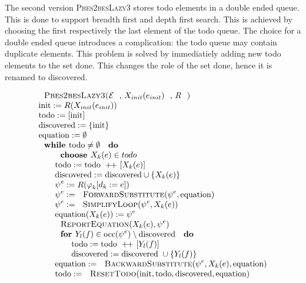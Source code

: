 The second version \textsc{Pbes2besLazy3} stores todo elements in a double ended queue. This is done to support
breadth first and depth first search. This is achieved by choosing the first respectively the last element of the todo
queue. The choice for a double ended queue introduces a complication: the todo queue may contain duplicate
elements. This problem is solved by immediatiely adding new todo elements to the set done. This changes the
role of the set done, hence it is renamed to discovered.

\begin{equation*}
\begin{array}{l}
\text{\textsc{Pbes2besLazy3(}}\mathcal{E}\text{, }X_{init}(e_{init})\text{, }%
R\text{\textsc{)}} \\
\mathrm{init}:=R(X_{init}(e_{init})) \\
\mathrm{todo}:=[\mathrm{init}] \\
\mathrm{discovered}:=\{ \mathrm{init} \} \\
\mathrm{equation}:=\emptyset  \\
\text{\textbf{while }}\mathrm{todo}\neq \emptyset \text{ \textbf{do}} \\
\qquad \text{\textbf{choose }}X_{k}(e)\in todo \\
\qquad \mathrm{todo}:=\mathrm{todo}\ +\!\!+ \ [X_{k}(e)] \\
\qquad \mathrm{discovered}:=\mathrm{discovered}\cup \{X_{k}(e)\} \\
\qquad \psi ^{e}:=R(\varphi _{k}[d_{k}:=e]) \\
\qquad \psi ^{e}:=\text{\textsc{ForwardSubstitute}}(\psi ^{e},\mathrm{%
equation}) \\
\qquad \psi ^{e}:=\text{\textsc{SimplifyLoop}}(\psi ^{e},X_{k}(e)) \\
\qquad \mathrm{equation}(X_{k}(e)):=\psi ^{e} \\
\qquad \text{\textsc{ReportEquation}}(X_{k}(e),\psi ^{e}) \\

\qquad \text{\textbf{for }} Y_{l}(f) \in \mathrm{occ}(\psi ^{e})\setminus \mathrm{discovered} \ \text{\textbf{do }}\\
\qquad \qquad \mathrm{todo}:=\mathrm{todo}\ +\!\!+ \ [Y_{l}(f)] \\
\qquad \qquad \mathrm{discovered}:=\mathrm{discovered}\ \cup \{Y_{l}(f)\} \\

\qquad \mathrm{equation}:=\text{\textsc{BackwardSubstitute}}(\psi
^{e},X_{k}(e),\mathrm{equation}) \\
\qquad \mathrm{todo}:=\text{\textsc{ResetTodo}}(\mathrm{init},\mathrm{todo},%
\mathrm{discovered},\mathrm{equation})%
\end{array}%
\end{equation*}

